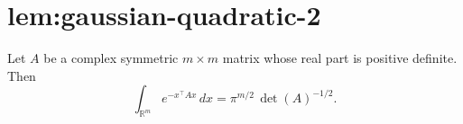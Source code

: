 \chapter{lem:gaussian-quadratic-2}\label{chap:lem_gaussian_quadratic_2}
\begin{lemma}
\label{lem:gaussian-quadratic-2}
Let $A$ be a complex symmetric $m \times m$ matrix whose real part is
positive definite. Then
\[
  \int_{\mathbb{R}^m} e^{-x^\top A x}\,dx = \pi^{m/2}\,\det(A)^{-1/2}.
\]
\end{lemma}
